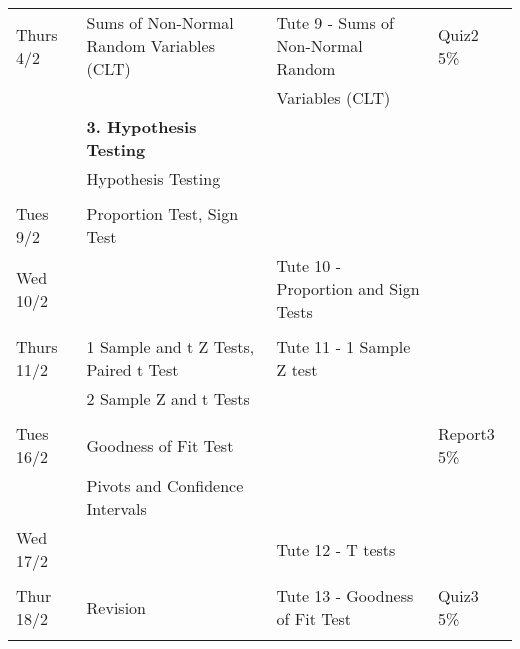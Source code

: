 \documentclass[bigtut]{quiz}
\begin{document}
\begin{tutorial}
{\begin{tabular}{|l|l|l|l|}
& &  & \\ \hline
Thurs 4/2 & Sums of Non-Normal Random Variables (CLT) & Tute 9 - Sums of Non-Normal Random & Quiz2 5\% \\
 &  & Variables (CLT) &  \\ 
& {\bf 3. Hypothesis Testing} & & \\ 
&  Hypothesis Testing & & \\ 
& & & \\ \hline
Tues 9/2 & Proportion Test, Sign Test &   &   \\
Wed 10/2 &  & Tute 10 - Proportion and Sign Tests &  \\
& & & \\ \hline
Thurs 11/2 & 1 Sample  and t Z Tests, Paired t Test   & Tute 11 - 1 Sample Z test   &  \\
 &  2 Sample Z and t Tests  &    & \\ 
& & & \\ \hline
Tues 16/2 & Goodness of Fit Test  &  & Report3 5\%   \\
 & Pivots and Confidence Intervals  & &  \\ 
Wed 17/2 & & Tute 12 - T tests  & \\ 
& & & \\ \hline

Thur 18/2 & Revision  & Tute 13 - Goodness of Fit Test  & Quiz3 5\%   \\
& & & \\ \hline
\end{tabular} }


\end{tutorial}
\end{document}
